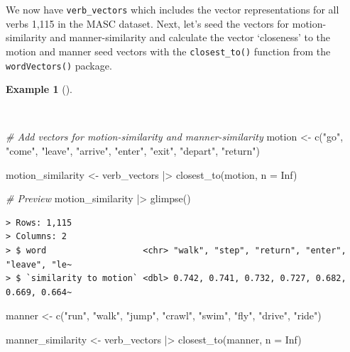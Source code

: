 \documentclass[
  letterpaper,
]{latex/krantz}
\newenvironment{Shaded}{\begin{snugshade}}{\end{snugshade}}
\newcommand{\AttributeTok}[1]{\textcolor[rgb]{0.00,0.00,0.00}{#1}}
\newcommand{\CommentTok}[1]{\textcolor[rgb]{0.00,0.00,0.00}{\textit{#1}}}
\newcommand{\ConstantTok}[1]{\textcolor[rgb]{0.00,0.00,0.00}{#1}}
\newcommand{\FunctionTok}[1]{\textcolor[rgb]{0.00,0.00,0.00}{#1}}
\newcommand{\NormalTok}[1]{\textcolor[rgb]{0.00,0.00,0.00}{#1}}
\newcommand{\OtherTok}[1]{\textcolor[rgb]{0.00,0.00,0.00}{#1}}
\newcommand{\SpecialCharTok}[1]{\textcolor[rgb]{0.00,0.00,0.00}{#1}}
\newcommand{\StringTok}[1]{\textcolor[rgb]{0.00,0.00,0.00}{#1}}
\theoremstyle{definition}
\newtheorem{example}{Example}[chapter]
\theoremstyle{remark}
\begin{document}
We now have \texttt{verb\_vectors} which includes the vector
representations for all verbs 1,115 in the MASC dataset. Next, let's
seed the vectors for motion-similarity and manner-similarity and
calculate the vector `closeness' to the motion and manner seed vectors
with the \texttt{closest\_to()} function from the \texttt{wordVectors()}
package.

\begin{example}[]\protect\hypertarget{exm-eda-masc-vsm-word2vec-manner-motion}{}\label{exm-eda-masc-vsm-word2vec-manner-motion}

~

\begin{Shaded}
\begin{Highlighting}[]
\CommentTok{\# Add vectors for motion{-}similarity and manner{-}similarity}
\NormalTok{motion }\OtherTok{\textless{}{-}}
  \FunctionTok{c}\NormalTok{(}\StringTok{"go"}\NormalTok{, }\StringTok{"come"}\NormalTok{, }\StringTok{"leave"}\NormalTok{, }\StringTok{"arrive"}\NormalTok{, }\StringTok{"enter"}\NormalTok{, }\StringTok{"exit"}\NormalTok{, }\StringTok{"depart"}\NormalTok{, }\StringTok{"return"}\NormalTok{)}

\NormalTok{motion\_similarity }\OtherTok{\textless{}{-}}
\NormalTok{  verb\_vectors }\SpecialCharTok{|\textgreater{}} \FunctionTok{closest\_to}\NormalTok{(motion, }\AttributeTok{n =} \ConstantTok{Inf}\NormalTok{)}

\CommentTok{\# Preview}
\NormalTok{motion\_similarity }\SpecialCharTok{|\textgreater{}} \FunctionTok{glimpse}\NormalTok{()}
\end{Highlighting}
\end{Shaded}

\begin{verbatim}
> Rows: 1,115
> Columns: 2
> $ word                   <chr> "walk", "step", "return", "enter", "leave", "le~
> $ `similarity to motion` <dbl> 0.742, 0.741, 0.732, 0.727, 0.682, 0.669, 0.664~
\end{verbatim}

\begin{Shaded}
\begin{Highlighting}[]
\NormalTok{manner }\OtherTok{\textless{}{-}}
  \FunctionTok{c}\NormalTok{(}\StringTok{"run"}\NormalTok{, }\StringTok{"walk"}\NormalTok{, }\StringTok{"jump"}\NormalTok{, }\StringTok{"crawl"}\NormalTok{, }\StringTok{"swim"}\NormalTok{, }\StringTok{"fly"}\NormalTok{, }\StringTok{"drive"}\NormalTok{, }\StringTok{"ride"}\NormalTok{)}

\NormalTok{manner\_similarity }\OtherTok{\textless{}{-}}
\NormalTok{  verb\_vectors }\SpecialCharTok{|\textgreater{}} \FunctionTok{closest\_to}\NormalTok{(manner, }\AttributeTok{n =} \ConstantTok{Inf}\NormalTok{)}


\end{Highlighting}
\end{Shaded}
\end{example}
\end{document}
